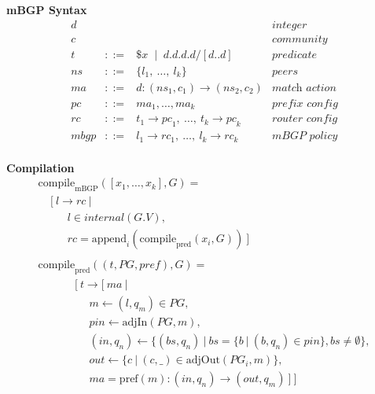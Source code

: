 \documentclass[twocolumn, openany]{sig-alternate-10pt}
\newcommand{\CompilePred}{\ensuremath{\mathrm{compile}_\mathrm{pred}}}
\newcommand{\CompileMbgp}{\ensuremath{\mathrm{compile}_\mathrm{mBGP}}}
\newcommand{\Append}{\ensuremath{\mathrm{append}}}
\newcommand{\Pref}{\ensuremath{\mathrm{pref}}}
\newcommand{\BNFALT}{\;\;|\;\;}
\newcommand{\hdr}[2]{\flushleft \chdr{\hspace{5mm}#1}{#2}}
\newcommand{\chdr}[2]{\textbf{#1} {#2} \\ \centering}%
\begin{document}
\begin{figure*}[h!]
  \vspace{1em}
  \begin{minipage}[t]{.46\linewidth}
  \hdr{mBGP Syntax}{}
  \vspace*{-1\baselineskip}
  \[ \begin{array}{rclr}
     d    &   & & \textit{integer} \\
     c    &   & & \textit{community} \\
     t    &::=& \$x \BNFALT d.d.d.d/[d..d] & \textit{predicate} \\
     ns   &::=& \{ l_1, ~\dots,~ l_k \} & \textit{peers} \\
     ma   &::=& d : ({ns}_1, c_1) \rightarrow ({ns}_2, c_2) & \textit{match action} \\
     pc   &::=& ma_1, \dots, ma_k & \textit{prefix config} \\
     rc   &::=& t_1 \rightarrow {pc}_1, ~\dots,~ t_k \rightarrow {pc}_k & \textit{router config} \\
     mbgp &::=& l_1 \rightarrow {rc}_1, ~\dots,~ l_k \rightarrow {rc}_k & \textit{mBGP policy} \\%
  \end{array} \]%

  \end{minipage}
  \begin{minipage}[t]{.5\linewidth}
  \hdr{Compilation}{}
  \vspace*{-1\baselineskip}
  \[ \begin{array}{l}
     \CompileMbgp( [x_1, \dots, x_k], G ) = \\
     ~~~~~ [~ l \rightarrow rc ~\vert~ \\
     ~~~~~~~~~~~~ l \in internal(G.V), \\
     ~~~~~~~~~~~~ rc = \Append_i (\CompilePred( x_i, G )) ~]  \\
     \\
     \CompilePred( (t,PG,pref), G ) = \\
     ~~~~~~~~~~~~~~~ [~ t \rightarrow [~ ma ~\vert~ \\
     ~~~~~~~~~~~~~~~~~~~~~ m \leftarrow (l,q_m) \in PG, \\
     ~~~~~~~~~~~~~~~~~~~~~ pin \leftarrow \text{adjIn}(PG,m), \\
     ~~~~~~~~~~~~~~~~~~~~~ (in,q_n) \leftarrow \{ (bs,q_n) ~\vert~ bs=\{b ~\vert~ (b,q_n) \in pin \}, bs \neq \emptyset \}, \\
     ~~~~~~~~~~~~~~~~~~~~~ out \leftarrow \{ c ~\vert~ (c,\_) \in \text{adjOut}(PG_i,m) \}, \\
     ~~~~~~~~~~~~~~~~~~~~~ ma = \Pref(m) : (in,q_n) \rightarrow (out,q_m) ~] ~] \\
     \\



\end{array}\]
\end{minipage}
\end{figure*}
\end{document}
